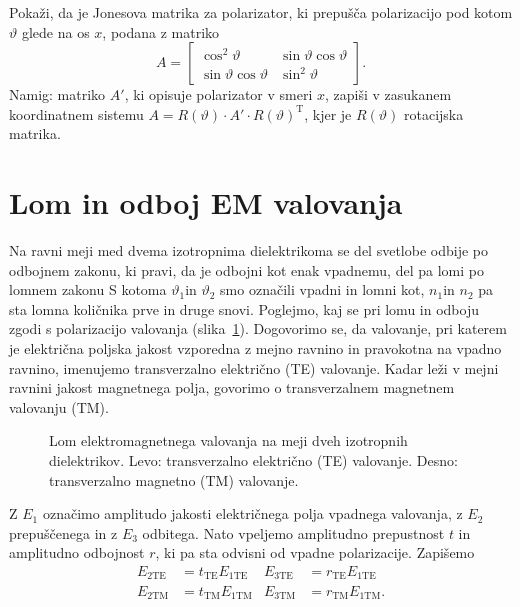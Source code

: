 \begin{definition}
Pokaži, da je Jonesova matrika za polarizator,
ki prepušča polarizacijo pod kotom $\vartheta$ glede na os $x$, podana z matriko
\begin{equation}
A=\left[\begin{array}{cc}
\cos^{2}\vartheta & \sin\vartheta\cos\vartheta\\
\sin\vartheta\cos\vartheta & \sin^{2}\vartheta
\end{array}\right].
\end{equation}
Namig: matriko $A'$, ki opisuje polarizator v smeri $x$, zapiši v zasukanem
koordinatnem sistemu $A=R(\vartheta) \cdot {A'}\cdot R(\vartheta)^\textrm{T}$, 
kjer je $R(\vartheta)$ rotacijska matrika.
\end{definition}

\section{Lom in odboj EM valovanja}
Na ravni meji med dvema izotropnima dielektrikoma se del svetlobe
odbije po odbojnem zakonu, ki pravi, da je odbojni kot enak vpadnemu, 
del pa lomi po lomnem zakonu 
S kotoma $\vartheta_{1}$in $\vartheta_{2}$ smo označili vpadni in lomni
kot, $n_{1}$in $n_{2}$ pa sta lomna količnika prve in druge snovi.
Poglejmo, kaj se pri lomu in odboju zgodi s polarizacijo valovanja (slika~\ref{fig:Lom}).
Dogovorimo se, da valovanje, pri katerem je električna poljska jakost vzporedna z mejno 
ravnino in pravokotna na vpadno ravnino, imenujemo transverzalno električno
(TE) valovanje. Kadar leži v mejni ravnini 
jakost magnetnega polja, govorimo o transverzalnem magnetnem valovanju 
(TM).\\

\begin{figure}[h]
\centering {} 
  
\caption{Lom elektromagnetnega valovanja na meji dveh izotropnih dielektrikov. 
Levo: transverzalno električno (TE) valovanje. Desno: transverzalno magnetno (TM) valovanje.}
\label{fig:Lom}
\end{figure}

Z $E_1$ označimo amplitudo jakosti električnega polja vpadnega valovanja, 
z $E_2$ prepuščenega in z $E_3$ odbitega.
Nato vpeljemo amplitudno prepustnost $t$ in amplitudno odbojnost $r$, 
ki pa sta odvisni od vpadne polarizacije. Zapišemo
\begin{align}
E_{2\mathrm{TE}} & =t_{\mathrm{TE}}E_{1\mathrm{TE}} & E_{3\mathrm{TE}} &=r_{\mathrm{TE}}E_{1\mathrm{TE}}\\
E_{2\mathrm{TM}} & =t_{\mathrm{TM}}E_{1\mathrm{TM}} & E_{3\mathrm{TM}}&=r_{\mathrm{TM}}E_{1\mathrm{TM}}.
\end{align}

